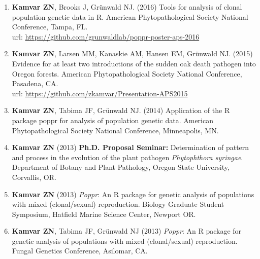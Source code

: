 \begin{enumerate}[leftmargin = 14pt]
	\item \textbf{Kamvar ZN}, Brooks J, Gr\"unwald NJ. (2016) Tools for analysis
	of clonal population genetic data in R. American Phytopathological Society
	National Conference, Tampa, FL.\\
	url: \href{https://github.com/grunwaldlab/poppr-poster-aps-2016#readme}{https://github.com/grunwaldlab/poppr-poster-aps-2016}

	\vspace{3pt}

	\item \textbf{Kamvar ZN}, Larsen MM, Kanaskie AM, Hansen EM, Gr\"unwald NJ.
	(2015) Evidence for at least two introductions of the sudden oak death
	pathogen into Oregon forests. American Phytopathological Society National
	Conference, Pasadena, CA. \\
	url: \href{https://github.com/zkamvar/Presentation-APS2015#readme}{https://github.com/zkamvar/Presentation-APS2015}

	\vspace{3pt}

	\item \textbf{Kamvar ZN}, Tabima JF, Gr\"unwald NJ. (2014) Application of
	the R package poppr for analysis of population genetic data. American
	Phytopathological Society National Conference, Minneapolis, MN.

	\vspace{3pt}

	\item \textbf{Kamvar ZN} (2013) \textbf{Ph.D. Proposal Seminar:} Determination of
	pattern and process in the evolution of the plant pathogen
	\textit{Phytophthora syringae}. Department of Botany and Plant Pathology,
	Oregon State University, Corvallis, OR.

	\vspace{3pt}

	\item \textbf{Kamvar ZN} (2013) \textit{Poppr}: An R package for genetic
	analysis of populations with mixed (clonal/sexual) reproduction. Biology
	Graduate Student Symposium, Hatfield Marine Science Center, Newport OR.

	\vspace{3pt}

	\item \textbf{Kamvar ZN}, Tabima JF, Gr\"unwald NJ (2013) \textit{Poppr}: An
	R package for genetic analysis of populations with mixed (clonal/sexual)
	reproduction. Fungal Genetics Conference, Asilomar, CA.


\end{enumerate}
